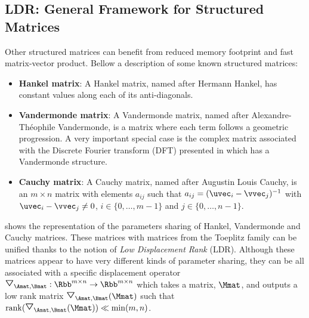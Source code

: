 \subsection{LDR: General Framework for Structured Matrices}
\label{subsection:ch2-general_frameworks_for_structured_matrices}


Other structured matrices can benefit from reduced memory footprint and fast matrix-vector product.
Bellow a description of some known structured matrices: 
\begin{itemize}
  \item \textbf{Hankel matrix}: A Hankel matrix, named after Hermann Hankel, has constant values along each of its anti-diagonals.
  \item \textbf{Vandermonde matrix}: A Vandermonde matrix, named after Alexandre-Théophile Vandermonde, is a matrix where each term follows a geometric progression.
    A very important special case is the complex matrix associated with the Discrete Fourier transform (DFT) presented in  which has a Vandermonde structure.
  \item \textbf{Cauchy matrix}: A Cauchy matrix, named after Augustin Louis Cauchy, is an $m \times n$ matrix with elements $a_{ij}$ such that $a_{ij} = (\uvec_i - \vvec_j)^{-1}$ with $\uvec_i - \vvec_j \neq 0$, $i \in \{0,\dots,m-1\}$ and $j \in \{0,\dots,n-1\}$.
\end{itemize}
 shows the representation of the parameters sharing of Hankel, Vandermonde and Cauchy matrices.
These matrices with matrices from the Toeplitz family can be unified thanks to the notion of \emph{Low Displacement Rank} (LDR).
Although these matrices appear to have very different kinds of parameter sharing, they can be all associated with a specific displacement operator $\triangleopdown_{\Amat, \Bmat}: \Rbb^{m \times n} \rightarrow \Rbb^{m \times n}$ which takes a matrix, $\Mmat$, and outputs a low rank matrix $\triangleopdown_{\Amat, \Bmat}(\Mmat)$ such that $\rank(\triangleopdown_{\Amat, \Bmat}(\Mmat)) \ll \min(m,n)$.

